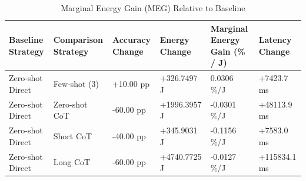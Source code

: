 \begin{table}
\caption{Marginal Energy Gain (MEG) Relative to Baseline}
\label{tab:marginal_energy_gain}
\begin{tabular}{llllll}
\toprule
Baseline Strategy & Comparison Strategy & Accuracy Change & Energy Change & Marginal Energy Gain (\% / J) & Latency Change \\
\midrule
Zero-shot Direct & Few-shot (3) & +10.00 pp & +326.7497 J & 0.0306 \%/J & +7423.7 ms \\
Zero-shot Direct & Zero-shot CoT & -60.00 pp & +1996.3957 J & -0.0301 \%/J & +48113.9 ms \\
Zero-shot Direct & Short CoT & -40.00 pp & +345.9031 J & -0.1156 \%/J & +7583.0 ms \\
Zero-shot Direct & Long CoT & -60.00 pp & +4740.7725 J & -0.0127 \%/J & +115834.1 ms \\
\bottomrule
\end{tabular}
\end{table}
